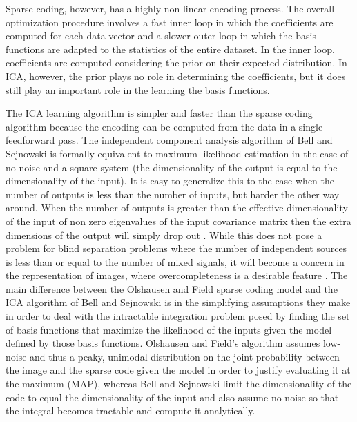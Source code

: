 Sparse coding, however, has a highly non-linear encoding process. The overall optimization procedure involves a fast inner loop in which the coefficients are computed for each data vector and a slower outer loop in which the basis functions are adapted to the statistics of the entire dataset. In the inner loop, coefficients are computed considering the prior on their expected distribution. In ICA, however, the prior plays no role in determining the coefficients, but it does still play an important role in the learning the basis functions.

The ICA learning algorithm is simpler and faster than the sparse coding algorithm because the encoding can be computed from the data in a single feedforward pass. The independent component analysis algorithm of Bell and Sejnowski \citeyearpar{bell1997independent} is formally equivalent to maximum likelihood estimation in the case of no noise and a square system (the dimensionality of the output is equal to the dimensionality of the input). It is easy to generalize this to the case when the number of outputs is less than the number of inputs, but harder the other way around. When the number of outputs is greater than the effective dimensionality of the input of non zero eigenvalues of the input covariance matrix then the extra dimensions of the output will simply drop out \parencite{livezey2016degeneracy, le2011ica}. While this does not pose a problem for blind separation problems where the number of independent sources is less than or equal to the number of mixed signals, it will become a concern in the representation of images, where overcompleteness is a desirable feature \parencite{simoncelli1991shiftable}. The main difference between the Olshausen and Field \citeyearpar{olshausen1996emergence} sparse coding model and the ICA algorithm of Bell and Sejnowski \citeyearpar{bell1997independent} is in the simplifying assumptions they make in order to deal with the intractable integration problem posed by finding the set of basis functions that maximize the likelihood of the inputs given the model defined by those basis functions. Olshausen and Field’s algorithm assumes low-noise and thus a peaky, unimodal distribution on the joint probability between the image and the sparse code given the model in order to justify evaluating it at the maximum (MAP), whereas Bell and Sejnowski limit the dimensionality of the code to equal the dimensionality of the input and also assume no noise so that the integral becomes tractable and compute it analytically.

